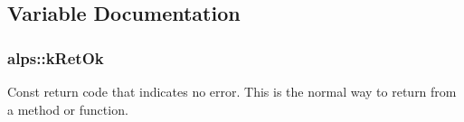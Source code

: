 \subsection{Variable Documentation}
\subsubsection[{\texorpdfstring{k\+Ret\+Ok}{kRetOk}}]{\setlength{\rightskip}{0pt plus 5cm}alps\+::k\+Ret\+Ok}\hypertarget{group__ERRORCODES_ga61cb36ecdcc8115b0d7bca4a0877222b}{}\label{group__ERRORCODES_ga61cb36ecdcc8115b0d7bca4a0877222b}
Const return code that indicates no error. This is the normal way to return from a method or function. 